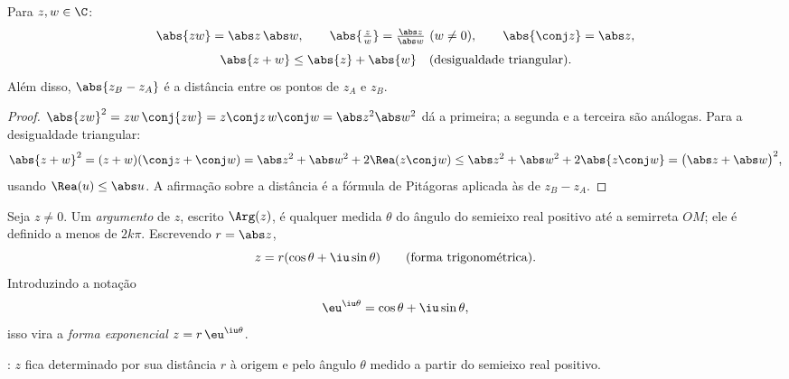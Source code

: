 \begin{proposition}\label{prop:g12:complex:modulus}
Para $z, w \in \C$:
\[
\abs{zw} = \abs z\,\abs w, \qquad
\abs{\tfrac zw} = \tfrac{\abs z}{\abs w}\ (w \neq 0), \qquad
\abs{\conj z} = \abs z,
\]
\[
\abs{z + w} \leq \abs{z} + \abs{w} \quad
\text{(desigualdade triangular)}.
\]
Além disso, $\abs{z_B - z_A}$ é a distância entre os pontos de 
$z_A$ e $z_B$.
\end{proposition}

\begin{proof}
$\abs{zw}^2 = zw\,\conj{zw} = z\conj z\, w \conj w = \abs z^2 \abs w^2$ dá
a primeira; a segunda e a terceira são análogas. Para a desigualdade
triangular:
\[
\abs{z+w}^2 = (z+w)(\conj z + \conj w)
= \abs z^2 + \abs w^2 + 2\Rea(z \conj w)
\leq \abs z^2 + \abs w^2 + 2\abs{z\conj w}
= \bigl(\abs z + \abs w\bigr)^2,
\]
usando $\Rea(u) \leq \abs u$. A afirmação sobre a distância é a fórmula de
Pitágoras aplicada às  de $z_B - z_A$.
\end{proof}

\begin{definition}\label{def:g12:complex:argument}
Seja $z \neq 0$. Um \emph{argumento} de $z$, escrito
$\Arg(z)$, é qualquer medida $\theta$ do ângulo do semieixo real positivo
até a semirreta $OM$; ele é definido a menos de $2k\pi$. Escrevendo
$r = \abs z$,
\[
z = r(\cos\theta + \iu\sin\theta)
\qquad\text{(forma trigonométrica)}.
\]
Introduzindo a notação
\[
\eu^{\iu\theta} = \cos\theta + \iu\sin\theta,
\]
isso vira a \emph{forma exponencial} $z = r\,\eu^{\iu\theta}$.
\end{definition}

\begin{omfigure}

{\small {}: $z$ fica determinado por sua distância $r$ à
origem e pelo ângulo $\theta$ medido a partir do semieixo real positivo.}
\end{omfigure}


